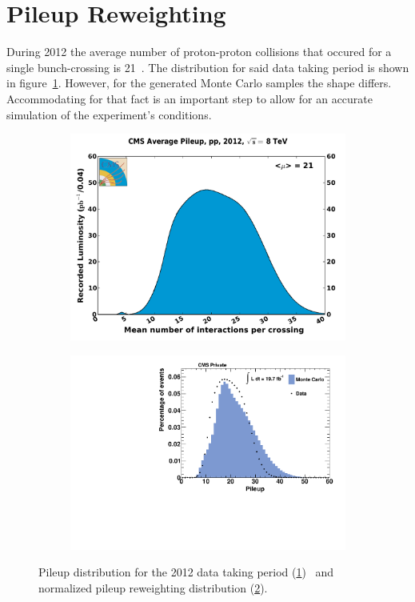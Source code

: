 {\section{Pileup Reweighting}
\label{sec:pileup}

During 2012 the average number of proton-proton collisions that occured for a single bunch-crossing is 21~\cite{cmslumi}. The distribution for said data taking period is shown in figure~\ref{fig:pileup2012}. However, for the generated Monte Carlo samples the shape differs. Accommodating for that fact is an important step to allow for an accurate simulation of the experiment's conditions.

\begin{figure}[htb!]
  \centering
  \begin{subfigure}[b]{0.495\textwidth}
    \centering
    \includegraphics[width=\textwidth]{plots/pileup_pp_2012.pdf}
    \caption{\label{fig:pileup2012}}
  \end{subfigure}
  \begin{subfigure}[b]{0.495\textwidth}
    \centering
    \includegraphics[width=\textwidth]{plots/pileup.pdf}
    \caption{\label{fig:pileup}}
  \end{subfigure}
  \caption{Pileup distribution for the 2012 data taking period (\ref{fig:pileup2012})~\cite{cmslumi} and normalized pileup reweighting distribution (\ref{fig:pileup}).}
  \label{fig:pileups}
\end{figure}

}
